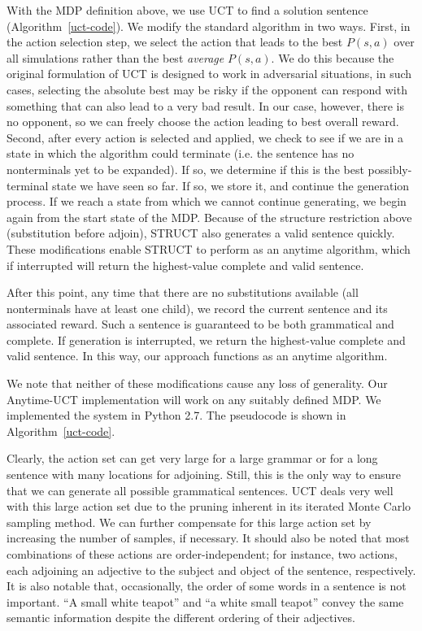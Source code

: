  With the MDP definition above, we use UCT to find a solution sentence
 (Algorithm~\ref{uct-code}). We modify the standard algorithm in two
 ways. First, in the action selection step, we select the action that
 leads to the best $P(s,a)$ over all simulations rather than the best
 {\em average} $P(s,a)$. We do this because the original formulation
 of UCT is designed to work in adversarial situations, in such cases,
 selecting the absolute best may be risky if the opponent can respond
 with something that can also lead to a very bad result. In our case,
 however, there is no opponent, so we can freely choose the action
 leading to best overall reward. Second, after every action is
 selected and applied, we check to see if we are in a state in which
 the algorithm could terminate (i.e. the sentence has no nonterminals
 yet to be expanded).  If so, we determine if this is the best
 possibly-terminal state we have seen so far.  If so, we store it, and
 continue the generation process. If we reach a state from which we
 cannot continue generating, we begin again from the start state of
 the MDP. Because of the structure restriction above (substitution
 before adjoin), STRUCT also generates a valid sentence quickly. These
 modifications enable STRUCT to perform as an anytime algorithm, which
 if interrupted will return the highest-value complete and valid
 sentence.

After this point, any time that there are no substitutions
available (all nonterminals have at least one child), we record the
current sentence and its associated reward.  Such a sentence is
guaranteed to be both grammatical and complete.  If generation is
interrupted, we return the highest-value complete and valid sentence.
In this way, our approach functions as an anytime algorithm.

 We note that neither of these modifications cause any loss of
 generality.  Our Anytime-UCT implementation will work on any suitably
 defined MDP.  We implemented the system in Python 2.7. The pseudocode
  is shown in Algorithm~\ref{uct-code}.

 Clearly, the action set can get very large for a large grammar or for
 a long sentence with many locations for adjoining.  Still, this is the
 only way to ensure that we can generate all possible grammatical
 sentences.  UCT deals very well with this large action set due to the
 pruning inherent in its iterated Monte Carlo sampling method.  We can
 further compensate for this large action set by increasing the number
 of samples, if necessary.  It should also be noted that most
 combinations of these actions are order-independent; for instance, two
 actions, each adjoining an adjective to the subject and object of the
 sentence, respectively.  It is also notable that, occasionally, the
 order of some words in a sentence is not important.  ``A small white
 teapot'' and ``a white small teapot'' convey the same semantic
 information despite the different ordering of their adjectives.

